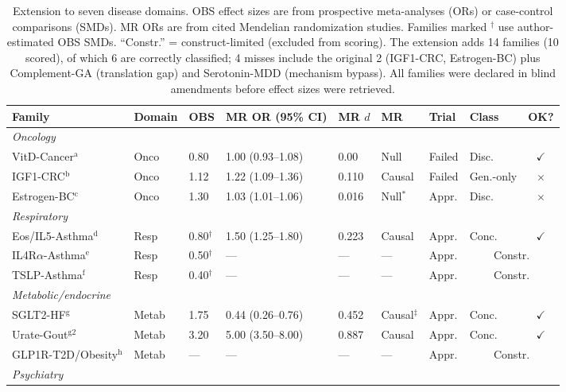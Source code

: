 \documentclass[11pt]{article}
\begin{document}
\begin{table}[t]
\centering
\caption{Extension to seven disease domains. OBS effect sizes are from prospective meta-analyses (ORs) or case-control comparisons (SMDs). MR ORs are from cited Mendelian randomization studies. Families marked $^\dagger$ use author-estimated OBS SMDs. ``Constr.'' = construct-limited (excluded from scoring). The extension adds 14 families (10 scored), of which 6 are correctly classified; 4 misses include the original 2 (IGF1-CRC, Estrogen-BC) plus Complement-GA (translation gap) and Serotonin-MDD (mechanism bypass). All families were declared in blind amendments before effect sizes were retrieved.}
\label{tab:extension}
\small
\begin{tabular}{llllllllc}
\toprule
Family & Domain & OBS & MR OR (95\% CI) & MR $d$ & MR & Trial & Class & OK? \\
\midrule
\multicolumn{9}{l}{\emph{Oncology}} \\
VitD-Cancer$^\text{a}$ & Onco & 0.80 & 1.00 (0.93--1.08) & 0.00 & Null & Failed & Disc. & $\checkmark$ \\
IGF1-CRC$^\text{b}$ & Onco & 1.12 & 1.22 (1.09--1.36) & 0.110 & Causal & Failed & Gen.-only & $\times$ \\
Estrogen-BC$^\text{c}$ & Onco & 1.30 & 1.03 (1.01--1.06) & 0.016 & Null$^*$ & Appr. & Disc. & $\times$ \\
\midrule
\multicolumn{9}{l}{\emph{Respiratory}} \\
Eos/IL5-Asthma$^\text{d}$ & Resp & 0.80$^\dagger$ & 1.50 (1.25--1.80) & 0.223 & Causal & Appr. & Conc. & $\checkmark$ \\
IL4R$\alpha$-Asthma$^\text{e}$ & Resp & 0.50$^\dagger$ & --- & --- & --- & Appr. & \multicolumn{2}{c}{Constr.} \\
TSLP-Asthma$^\text{f}$ & Resp & 0.40$^\dagger$ & --- & --- & --- & Appr. & \multicolumn{2}{c}{Constr.} \\
\midrule
\multicolumn{9}{l}{\emph{Metabolic/endocrine}} \\
SGLT2-HF$^\text{g}$ & Metab & 1.75 & 0.44 (0.26--0.76) & 0.452 & Causal$^\ddagger$ & Appr. & Conc. & $\checkmark$ \\
Urate-Gout$^\text{g2}$ & Metab & 3.20 & 5.00 (3.50--8.00) & 0.887 & Causal & Appr. & Conc. & $\checkmark$ \\
GLP1R-T2D/Obesity$^\text{h}$ & Metab & --- & --- & --- & --- & Appr. & \multicolumn{2}{c}{Constr.} \\
\midrule
\multicolumn{9}{l}{\emph{Psychiatry}} \\

\end{tabular}
\end{table}
\end{document}
